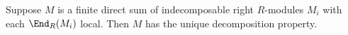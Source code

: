 Suppose $M$ is a finite direct sum of indecomposable right $R$-modules $M_i$ with
each $\End_R(M_i)$ local. Then $M$ has the unique decomposition property.
